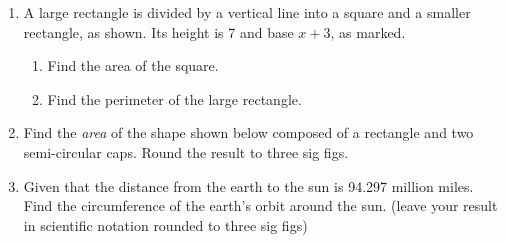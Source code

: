 \begin{enumerate}
\newpage
\item A large rectangle is divided by a vertical line into a square and a smaller rectangle, as shown. Its height is 7 and base $x+3$, as marked.
\begin{multicols}{2}
  \begin{enumerate}
    \item Find the area of the square. \vspace{2cm}
    \item Find the perimeter of the large rectangle.
    \end{enumerate}
  \end{multicols} \vspace{1cm}

\item Find the \emph{area} of the shape shown below composed of a rectangle and two semi-circular caps. Round the result to three sig figs.
\begin{flushright}
\end{flushright} \vspace{2cm}

\item Given that the distance from the earth to the sun is 94.297 million miles. Find the circumference of the earth's orbit around the sun. (leave your result in scientific notation rounded to three sig figs)


\end{enumerate}

